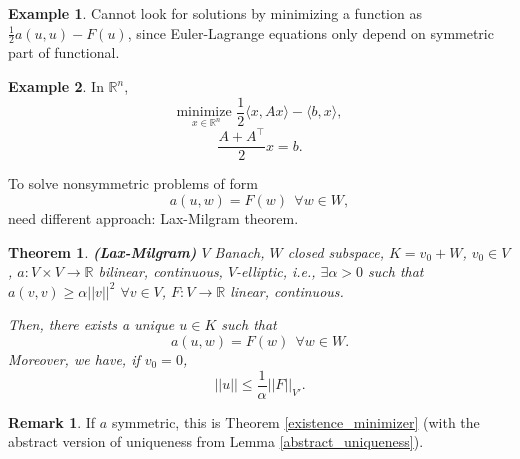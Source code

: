 \documentclass[12pt]{article}
\newtheorem{theorem}{Theorem}[section]
\theoremstyle{definition}
\newtheorem*{remark}{Remark}
\newtheorem*{example*}{Example}
\begin{document}
\begin{example*}
Cannot look for solutions by minimizing a function as $\frac{1}{2}a(u,u)-F(u)$, since Euler-Lagrange equations only depend on symmetric part of functional.
\end{example*}

\begin{example*}
In $\mathbb{R}^n$,
\[\underset{x\in\mathbb{R}^n}{\text{minimize }}\frac{1}{2}\langle x,Ax\rangle-\langle b,x\rangle,\]
\[\frac{A+A^{\intercal}}{2}x=b.\]

To solve nonsymmetric problems of form
\[a(u,w)=F(w)\ \ \forall w\in W,\]
need different approach: Lax-Milgram theorem.
\end{example*}

\begin{theorem}
\emph{\textbf{(Lax-Milgram)}} $V$ Banach, $W$ closed subspace, $K=v_0+W$, $v_0\in V$, $a:V\times V\rightarrow\mathbb{R}$ bilinear, continuous, $V$-elliptic, i.e., $\exists\alpha>0$ such that $a(v,v)\geq\alpha||v||^2$ $\forall v\in V$, $F:V\rightarrow\mathbb{R}$ linear, continuous.

Then, there exists a unique $u\in K$ such that
\[a(u,w)=F(w)\ \ \forall w\in W.\]
Moreover, we have, if $v_0=0$,
\[||u||\leq\frac{1}{\alpha}||F||_{V'}.\]
\end{theorem}

\begin{remark}
If $a$ symmetric, this is Theorem \ref{existence_minimizer} (with the abstract version of uniqueness from Lemma \ref{abstract_uniqueness}).
\end{remark}
\end{document}
